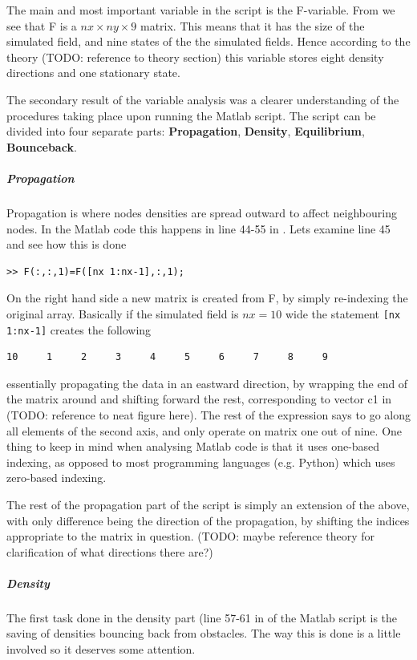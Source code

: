 The main and most important variable in the script is the F-variable. From  we see that F is a $nx\times ny\times 9$ matrix. This means that it has the size of the simulated field, and nine states of the the simulated fields. Hence according to the theory (TODO: reference to theory section) this variable stores eight density directions and one stationary state. 

The secondary result of the variable analysis was a clearer understanding of the procedures taking place upon running the Matlab script. The script can be divided into four separate parts: \textbf{Propagation}, \textbf{Density}, \textbf{Equilibrium}, \textbf{Bounceback}.

\subparagraph{Propagation} 
Propagation is where nodes densities are spread outward to affect neighbouring nodes. In the Matlab code this happens in line 44-55 in . Lets examine line 45 and see how this is done

\begin{verbatim}
>> F(:,:,1)=F([nx 1:nx-1],:,1);
\end{verbatim}

On the right hand side a new matrix is created from F, by simply re-indexing the original array. Basically if the simulated field is $nx=10$ wide the statement \texttt{[nx 1:nx-1]} creates the following

\begin{verbatim}
10     1     2     3     4     5     6     7     8     9
\end{verbatim}

essentially propagating the data in an eastward direction, by wrapping the end of the matrix around and shifting forward the rest, corresponding to vector c1 in (TODO: reference to neat figure here). The rest of the expression says to go along all elements of the second axis, and only operate on matrix one out of nine. One thing to keep in mind when analysing Matlab code is that it uses one-based indexing, as opposed to most programming languages (e.g. Python) which uses zero-based indexing.

The rest of the propagation part of the script is simply an extension of the above, with only difference being the direction of the propagation, by shifting the indices appropriate to the matrix in question. (TODO: maybe reference theory for clarification of what directions there are?)

\subparagraph*{Density}
The first task done in the density part (line 57-61 in  of the Matlab script is the saving of densities bouncing back from obstacles. The way this is done is a little involved so it deserves some attention.

